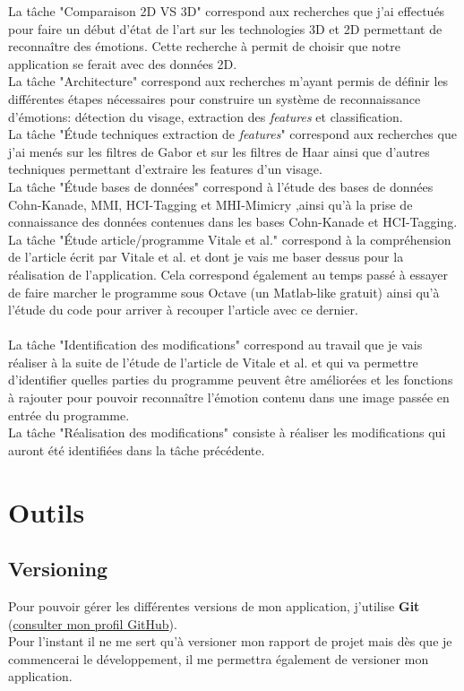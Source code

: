 \documentclass[overfullbox, poster]{polytech/polytech}
\begin{document}
La tâche "Comparaison 2D VS 3D" correspond aux recherches que j'ai effectués pour faire un début d'état de l'art sur les technologies 3D et 2D permettant de reconnaître des émotions. Cette recherche à permit de choisir que notre application se ferait avec des données 2D.\\
La tâche "Architecture" correspond aux recherches m'ayant permis de définir les différentes étapes nécessaires pour construire un système de reconnaissance d'émotions: détection du visage, extraction des \textit{features} et classification.\\
La tâche "Étude techniques extraction de \textit{features}" correspond aux recherches que j'ai menés sur les filtres de Gabor et sur les filtres de Haar ainsi que d'autres techniques permettant d'extraire les features d'un visage.\\
La tâche "Étude bases de données" correspond à l'étude des bases de données Cohn-Kanade, MMI, HCI-Tagging et MHI-Mimicry ,ainsi qu'à la prise de connaissance des données contenues dans les bases Cohn-Kanade et HCI-Tagging.\\
La tâche "Étude article/programme Vitale et al." correspond à la compréhension de l'article écrit par Vitale et al. et dont je vais me baser dessus pour la réalisation de l'application. Cela correspond également au temps passé à essayer de faire marcher le programme sous Octave (un Matlab-like gratuit) ainsi qu'à l'étude du code pour arriver à recouper l'article avec ce dernier.\\
\\
La tâche "Identification des modifications" correspond au travail que je vais réaliser à la suite de l'étude de l'article de Vitale et al. et qui va permettre d'identifier quelles parties du programme peuvent être améliorées et les fonctions à rajouter pour pouvoir reconnaître l'émotion contenu dans une image passée en entrée du programme.\\
La tâche "Réalisation des modifications" consiste à réaliser les modifications qui auront été identifiées dans la tâche précédente.

\section{Outils}
\subsection{Versioning}
Pour pouvoir gérer les différentes versions de mon application, j'utilise \textbf{Git} (\href{https://github.com/flo3693}{consulter mon profil GitHub}).\\
Pour l'instant il ne me sert qu'à versioner mon rapport de projet mais dès que je commencerai le développement, il me permettra également de versioner mon application.
\end{document}
